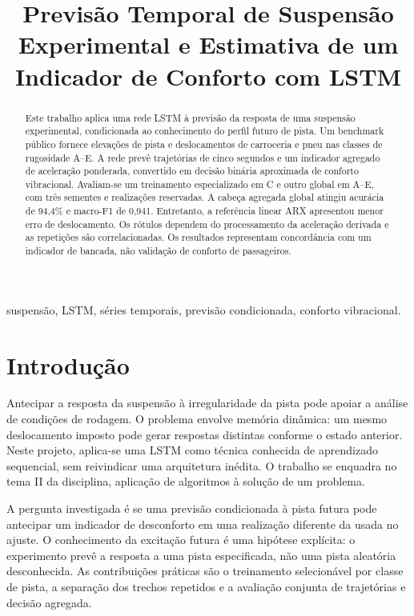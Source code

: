 \documentclass[conference]{IEEEtran}
\title{Previsão Temporal de Suspensão Experimental e Estimativa de um Indicador de Conforto com LSTM}
\author{\IEEEauthorblockN{Pedro Druck Montalvão Reis}\IEEEauthorblockA{Disciplina: Inteligência Artificial II}}
\begin{document}
\maketitle
\begin{abstract}
Este trabalho aplica uma rede LSTM à previsão da resposta de uma suspensão experimental, condicionada ao conhecimento do perfil futuro de pista. Um benchmark público fornece elevações de pista e deslocamentos de carroceria e pneu nas classes de rugosidade A--E. A rede prevê trajetórias de cinco segundos e um indicador agregado de aceleração ponderada, convertido em decisão binária aproximada de conforto vibracional. Avaliam-se um treinamento especializado em C e outro global em A--E, com três sementes e realizações reservadas. A cabeça agregada global atingiu acurácia de 94,4\% e macro-F1 de 0,941. Entretanto, a referência linear ARX apresentou menor erro de deslocamento. Os rótulos dependem do processamento da aceleração derivada e as repetições são correlacionadas. Os resultados representam concordância com um indicador de bancada, não validação de conforto de passageiros.
\end{abstract}
\begin{IEEEkeywords}
suspensão, LSTM, séries temporais, previsão condicionada, conforto vibracional.
\end{IEEEkeywords}

\section{Introdução}
Antecipar a resposta da suspensão à irregularidade da pista pode apoiar a análise de condições de rodagem. O problema envolve memória dinâmica: um mesmo deslocamento imposto pode gerar respostas distintas conforme o estado anterior. Neste projeto, aplica-se uma LSTM como técnica conhecida de aprendizado sequencial, sem reivindicar uma arquitetura inédita. O trabalho se enquadra no tema II da disciplina, aplicação de algoritmos à solução de um problema.

A pergunta investigada é se uma previsão condicionada à pista futura pode antecipar um indicador de desconforto em uma realização diferente da usada no ajuste. O conhecimento da excitação futura é uma hipótese explícita: o experimento prevê a resposta a uma pista especificada, não uma pista aleatória desconhecida. As contribuições práticas são o treinamento selecionável por classe de pista, a separação dos trechos repetidos e a avaliação conjunta de trajetórias e decisão agregada.
\end{document}
